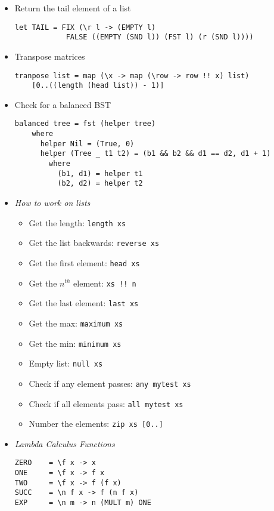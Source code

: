 \documentclass[landscape,8pt]{extarticle}
\newcommand{\code}{\lstinline}
\begin{document}
\begin{multicols}{3}
\begin{itemize}
\begin{lstlisting}
-- A function that checks to see if a number is in a list
INLIST = FIX (\r e l -> (EMPTY l)
    FALSE ((EQ (FST l) e) TRUE (r e (SND l))))
\end{lstlisting}
\item Return the tail element of a list
\begin{lstlisting}
let TAIL = FIX (\r l -> (EMPTY l)
            FALSE ((EMPTY (SND l)) (FST l) (r (SND l))))
\end{lstlisting}
\item Transpose matrices
\begin{lstlisting}
tranpose list = map (\x -> map (\row -> row !! x) list)
    [0..((length (head list)) - 1)]
\end{lstlisting}
\item Check for a balanced BST
\begin{lstlisting}
balanced tree = fst (helper tree)
    where
      helper Nil = (True, 0)
      helper (Tree _ t1 t2) = (b1 && b2 && d1 == d2, d1 + 1)
        where
          (b1, d1) = helper t1
          (b2, d2) = helper t2
\end{lstlisting}
\item \emph{How to work on lists}
\begin{itemize}
    \item Get the length: \code{length xs}
    \item Get the list backwards: \code{reverse xs}
    \item Get the first element: \code{head xs}
    \item Get the $n^{th}$ element: \code{xs !! n}
    \item Get the last element: \code{last xs}
    \item Get the max: \code{maximum xs}
    \item Get the min: \code{minimum xs}
    \item Empty list: \code{null xs}
    \item Check if any element passes: \code{any mytest xs}
    \item Check if all elements pass: \code{all mytest xs}
    \item Number the elements: \code{zip xs [0..]}
\end{itemize}
        \item \emph{Lambda Calculus Functions}
              \begin{lstlisting}
ZERO    = \f x -> x
ONE     = \f x -> f x
TWO     = \f x -> f (f x)
SUCC    = \n f x -> f (n f x)
EXP     = \n m -> n (MULT m) ONE


\end{lstlisting}
\end{itemize}
\end{multicols}
\end{document}
